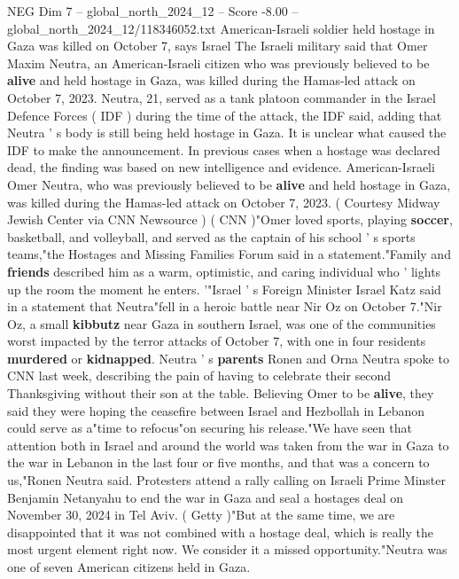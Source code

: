 \begin{textsample}{NEG Dim 7 – global\_north\_2024\_12 – Score -8.00 – global\_north\_2024\_12/118346052.txt}  \label{ex:f7_neg_160}
American-Israeli soldier held hostage in Gaza was killed on October 7, says Israel The Israeli military said that Omer Maxim Neutra, an American-Israeli citizen who was previously believed to be \textbf{alive} and held hostage in Gaza, was killed during the Hamas-led attack on October 7, 2023.
Neutra, 21, served as a tank platoon commander in the Israel Defence Forces ( IDF ) during the time of the attack, the IDF said, adding that Neutra ' s body is still being held hostage in Gaza.
It is unclear what caused the IDF to make the announcement.
In previous cases when a hostage was declared dead, the finding was based on new intelligence and evidence.
American-Israeli Omer Neutra, who was previously believed to be \textbf{alive} and held hostage in Gaza, was killed during the Hamas-led attack on October 7, 2023. ( Courtesy Midway Jewish Center via CNN Newsource ) ( CNN )"Omer loved sports, playing \textbf{soccer}, basketball, and volleyball, and served as the captain of his school ' s sports teams,"the Hostages and Missing Families Forum said in a statement."Family and \textbf{friends} described him as a warm, optimistic, and caring individual who ' lights up the room the moment he enters. '"Israel ' s Foreign Minister Israel Katz said in a statement that Neutra"fell in a heroic battle near Nir Oz on October 7."Nir Oz, a small \textbf{kibbutz} near Gaza in southern Israel, was one of the communities worst impacted by the terror attacks of October 7, with one in four residents \textbf{murdered} or \textbf{kidnapped}.
Neutra ' s \textbf{parents} Ronen and Orna Neutra spoke to CNN last week, describing the pain of having to celebrate their second Thanksgiving without their son at the table.
Believing Omer to be \textbf{alive}, they said they were hoping the ceasefire between Israel and Hezbollah in Lebanon could serve as a"time to refocus"on securing his release."We have seen that attention both in Israel and around the world was taken from the war in Gaza to the war in Lebanon in the last four or five months, and that was a concern to us,"Ronen Neutra said.
Protesters attend a rally calling on Israeli Prime Minster Benjamin Netanyahu to end the war in Gaza and seal a hostages deal on November 30, 2024 in Tel Aviv. ( Getty )"But at the same time, we are disappointed that it was not combined with a hostage deal, which is really the most urgent element right now.
We consider it a missed opportunity."Neutra was one of seven American citizens held in Gaza.

\end{textsample}

